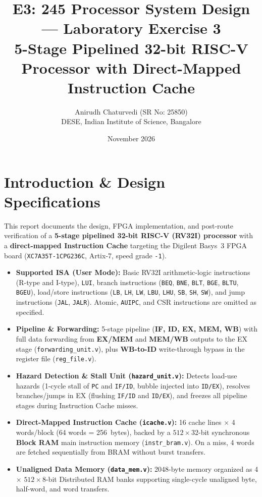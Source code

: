 \documentclass[11pt,a4paper]{article}
\title{\textbf{E3: 245 Processor System Design --- Laboratory Exercise 3}\\
\large 5-Stage Pipelined 32-bit RISC-V Processor with Direct-Mapped Instruction Cache}
\author{Anirudh Chaturvedi (SR No: 25850)\\DESE, Indian Institute of Science, Bangalore}
\date{November 2026}
\begin{document}
\maketitle

\section{Introduction \& Design Specifications}
This report documents the design, FPGA implementation, and post-route verification of a \textbf{5-stage pipelined 32-bit RISC-V (RV32I) processor} with a \textbf{direct-mapped Instruction Cache} targeting the Digilent Basys~3 FPGA board (\texttt{XC7A35T-1CPG236C}, Artix-7, speed grade \texttt{-1}).

\begin{itemize}
    \item \textbf{Supported ISA (User Mode):} Basic RV32I arithmetic-logic instructions (R-type and I-type), \texttt{LUI}, branch instructions (\texttt{BEQ}, \texttt{BNE}, \texttt{BLT}, \texttt{BGE}, \texttt{BLTU}, \texttt{BGEU}), load/store instructions (\texttt{LB}, \texttt{LH}, \texttt{LW}, \texttt{LBU}, \texttt{LHU}, \texttt{SB}, \texttt{SH}, \texttt{SW}), and jump instructions (\texttt{JAL}, \texttt{JALR}). Atomic, \texttt{AUIPC}, and CSR instructions are omitted as specified.
    \item \textbf{Pipeline \& Forwarding:} 5-stage pipeline (\textbf{IF, ID, EX, MEM, WB}) with full data forwarding from \textbf{EX/MEM} and \textbf{MEM/WB} outputs to the EX stage (\texttt{forwarding\_unit.v}), plus \textbf{WB-to-ID} write-through bypass in the register file (\texttt{reg\_file.v}).
    \item \textbf{Hazard Detection \& Stall Unit (\texttt{hazard\_unit.v}):} Detects load-use hazards (1-cycle stall of \texttt{PC} and \texttt{IF/ID}, bubble injected into \texttt{ID/EX}), resolves branches/jumps in EX (flushing \texttt{IF/ID} and \texttt{ID/EX}), and freezes all pipeline stages during Instruction Cache misses.
    \item \textbf{Direct-Mapped Instruction Cache (\texttt{icache.v}):} 16 cache lines $\times$ 4 words/block (64 words = 256~bytes), backed by a $512 \times 32$-bit synchronous \textbf{Block RAM} main instruction memory (\texttt{instr\_bram.v}). On a miss, 4 words are fetched sequentially from BRAM without burst transfers.
    \item \textbf{Unaligned Data Memory (\texttt{data\_mem.v}):} 2048-byte memory organized as 4 $\times$ $512 \times 8$-bit Distributed RAM banks supporting single-cycle unaligned byte, half-word, and word transfers.
\end{itemize}
\end{document}
